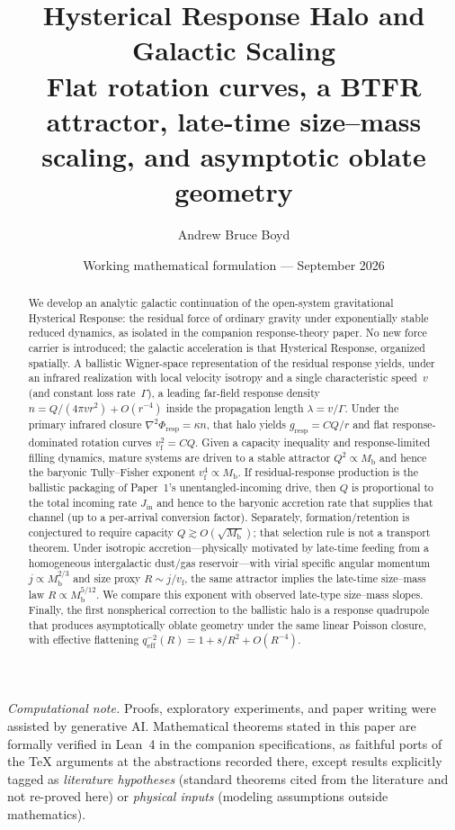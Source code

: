 \documentclass[11pt]{article}
\title{\textbf{Hysterical Response Halo and Galactic Scaling}\\[0.45em]
\large Flat rotation curves, a BTFR attractor, late-time size--mass scaling, and asymptotic oblate geometry}
\author{Andrew Bruce Boyd}
\date{Working mathematical formulation --- September 2026}
\theoremstyle{definition}
\theoremstyle{remark}
\newcommand{\Mb}{M_{\mathrm{b}}}
\newcommand{\vf}{v_{\mathrm{f}}}
\newcommand{\qeff}{q_{\mathrm{eff}}}
\begin{document}
\maketitle
\noindent\textit{Computational note.}
Proofs, exploratory experiments, and paper writing were assisted by generative AI.
Mathematical theorems stated in this paper are formally verified in Lean~4 in the
companion specifications, as faithful ports of the TeX arguments at the abstractions
recorded there, except results explicitly tagged as \emph{literature hypotheses}
(standard theorems cited from the literature and not re-proved here) or
\emph{physical inputs} (modeling assumptions outside mathematics).

\begin{abstract}
We develop an analytic galactic continuation of the open-system gravitational Hysterical Response: the residual force of ordinary gravity under exponentially stable reduced dynamics, as isolated in the companion response-theory paper.
No new force carrier is introduced; the galactic acceleration is that Hysterical Response, organized spatially.
A ballistic Wigner-space representation of the residual response yields, under an infrared realization with local velocity isotropy and a single characteristic speed~$v$ (and constant loss rate~$\Gamma$), a leading far-field response density $n=Q/(4\pi v r^{2})+O(r^{-4})$ inside the propagation length $\lambda=v/\Gamma$.
Under the primary infrared closure $\nabla^{2}\Phi_{\mathrm{resp}}=\kappa n$, that halo yields $g_{\mathrm{resp}}=CQ/r$ and flat response-dominated rotation curves $\vf^{2}=CQ$.
Given a capacity inequality and response-limited filling dynamics, mature systems are driven to a stable attractor $Q^{2}\propto\Mb$ and hence the baryonic Tully--Fisher exponent $\vf^{4}\propto\Mb$.
If residual-response production is the ballistic packaging of Paper~1's unentangled-incoming drive, then $Q$ is proportional to the total incoming rate $J_{\mathrm{in}}$ and hence to the baryonic accretion rate that supplies that channel (up to a per-arrival conversion factor).
Separately, formation/retention is conjectured to require capacity $\boxed{Q\gtrsim O(\sqrt{\Mb})}$; that selection rule is not a transport theorem.
Under isotropic accretion---physically motivated by late-time feeding from a homogeneous intergalactic dust/gas reservoir---with virial specific angular momentum $j\propto\Mb^{2/3}$ and size proxy $R\sim j/\vf$, the same attractor implies the late-time size--mass law $R\propto\Mb^{5/12}$.
We compare this exponent with observed late-type size--mass slopes.
Finally, the first nonspherical correction to the ballistic halo is a response quadrupole that produces asymptotically oblate geometry under the same linear Poisson closure, with effective flattening $\qeff^{-2}(R)=1+s/R^{2}+O(R^{-4})$.
\end{abstract}
\tableofcontents
\newpage
\end{document}

